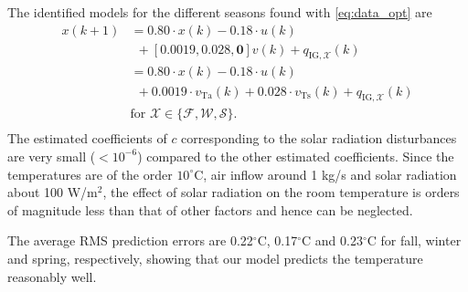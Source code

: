 The identified models for the different seasons found with \eqref{eq:data_opt} are
\begin{equation}\label{eq:lumped_zone_res}
\begin{aligned}
x(k+1) & = 0.80\cdot x(k) - 0.18\cdot u(k) \\
 & ~~ + \left[0.0019, 0.028, \mathbf{0} \right] v(k) + q_{\text{IG},\mathcal{X}}(k) \\
 & =  0.80\cdot x(k) - 0.18\cdot u(k) \\
 & ~~ + 0.0019 \cdot v_{\text{Ta}}(k) + 0.028 \cdot v_{\text{Ts}}(k) + q_{\text{IG},\mathcal{X}}(k) \\
 & \text{for } \mathcal{X} \in \lbrace \mathcal{F}, \mathcal{W}, \mathcal{S} \rbrace.\\
\end{aligned}
\end{equation}
The estimated coefficients of $c$ corresponding to the solar radiation disturbances are very small ($< 10^{-6}$) compared to the other estimated coefficients. Since the temperatures are of the order $10^{\circ}$C, air inflow around 1 kg/s and solar radiation about 100 W/m$^2$, the effect of solar radiation on the room temperature is orders of magnitude less than that of other factors and hence can be neglected.

The average RMS prediction errors are 0.22$^{\circ}$C, 0.17$^{\circ}$C and 0.23$^{\circ}$C for fall, winter and spring, respectively, showing that our model predicts the temperature reasonably well. 



